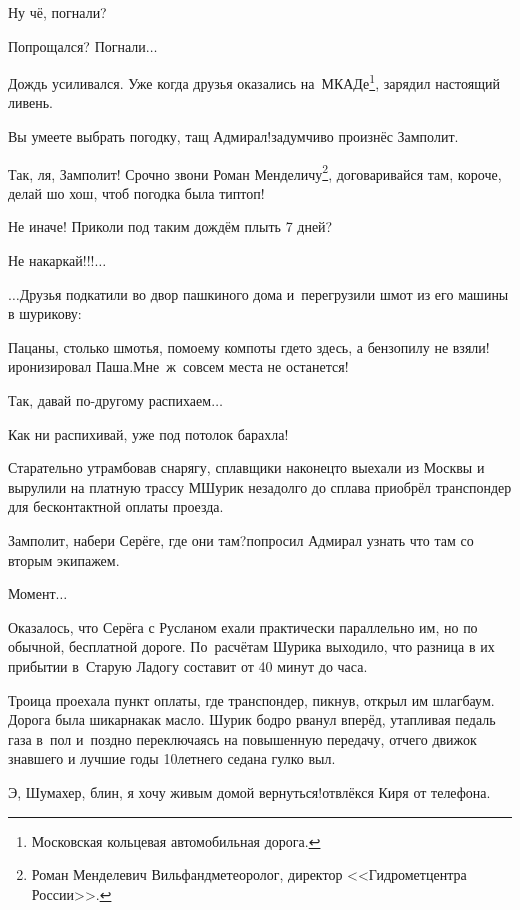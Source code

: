\diagdash Ну чё, погнали?

\diagdash Попрощался? Погнали$\ldots$

Дождь усиливался. Уже когда друзья оказались на~МКАДе\footnote{Московская кольцевая автомобильная дорога.}, зарядил настоящий ливень.

\diagdash Вы умеете выбрать погодку, тащ Адмирал!\mdash задумчиво произнёс Замполит. 

\renewcommand*{\thefootnote}{\fnsymbol{footnote}}
\diagdash Так, ля, Замполит! Срочно звони Роман Менделичу\footnote[1]{Роман Менделевич Вильфанд\mdash метеоролог, директор <<Гидрометцентра России>>.}, договаривайся там, короче, делай шо хош, чтоб погодка была тип\sdash топ!

\diagdash Не иначе! Приколи под таким дождём плыть 7 дней?

\diagdash Не накаркай!!!$\ldots$

$\ldots$Друзья подкатили во двор пашкиного дома и~перегрузили шмот из его машины в шурикову:

\diagdash Пацаны, столько шмотья, по\sdash моему компоты где\sdash то здесь, а бензопилу не взяли!\mdash иронизировал Паша.\mdash Мне~ж~совсем места не останется!

\diagdash Так, давай по-другому распихаем$\ldots$

\diagdash Как ни распихивай, уже под потолок барахла!

Старательно утрамбовав снарягу, сплавщики наконец\sdash то выехали из Москвы и вырулили на платную трассу М\mdash Шурик незадолго до сплава приобрёл транспондер для бесконтактной оплаты проезда.

\diagdash Замполит, набери Серёге, где они там?\mdash попросил Адмирал узнать что там со вторым экипажем.

\diagdash Момент$\ldots$

Оказалось, что Серёга с Русланом ехали практически параллельно им, но по обычной, бесплатной дороге. По~расчётам Шурика выходило, что разница в их прибытии в~Старую Ладогу составит от 40 минут до часа.

Троица проехала пункт оплаты, где транспондер, пикнув, открыл им шлагбаум. Дорога была шикарна\mdash как масло. Шурик бодро рванул вперёд, утапливая педаль газа в~пол и~поздно переключаясь на повышенную передачу, отчего движок знавшего и лучшие годы 10\sdash летнего седана гулко выл. 

\diagdash Э, Шумахер, блин, я хочу живым домой вернуться!\mdash отвлёкся Киря от телефона.

